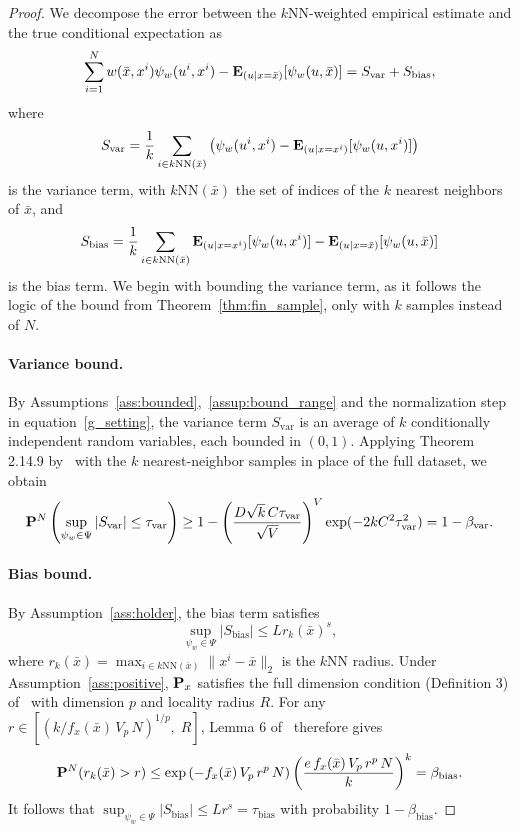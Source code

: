 \documentclass[11pt]{article}
\begin{document}
\begin{proof}
We decompose the error between the $k$NN-weighted empirical estimate and the true conditional expectation as
$$\sum_{i=1}^N w(\bar{x}, x^i) \psi_w(u^i, x^i) - \mathbf{E}_{(u | x = \bar{x})}[\psi_w(u, \bar{x})] = S_{\mathrm{var}} + S_{\mathrm{bias}},$$
where
$$S_{\mathrm{var}} = \frac{1}{k}\sum_{i \in k\text{NN}(\bar{x})} \left(\psi_w(u^{i}, x^{i}) - \mathbf{E}_{(u | x = x^{i})}[\psi_w(u, x^{i})]\right)$$
is the variance term, with $k\text{NN}(\bar{x})$ the set of indices of the $k$ nearest neighbors of $\bar{x}$, and
$$S_{\mathrm{bias}} = \frac{1}{k}\sum_{i \in k\text{NN}(\bar{x})} \mathbf{E}_{(u | x = x^{i})}[\psi_w(u, x^{i})] - \mathbf{E}_{(u | x = \bar{x})}[\psi_w(u, \bar{x})]$$
is the bias term. We begin with bounding the variance term, as it follows the logic of the bound from Theorem~\ref{thm:fin_sample}, only with $k$ samples instead of $N$.

\paragraph{Variance bound.}
By Assumptions~\ref{ass:bounded},~\ref{assup:bound_range} and the normalization step in equation~\eqref{g_setting}, the variance term $S_{\mathrm{var}}$ is an average of $k$ conditionally independent random variables, each bounded in $(0,1)$.
Applying Theorem 2.14.9 by~\cite{empirical} with the $k$ nearest-neighbor samples in place of the full dataset, we obtain
$${\mathbf P}^{N}\left (\sup_{\psi_{w} \in \Psi} |S_{\mathrm{var}}| \leq \tau_{\mathrm{var}}\right ) \geq 1 - \left (\frac{D\sqrt{k}\,C\tau_{\mathrm{var}}}{\sqrt{V}}\right )^V\exp(-2kC^2\tau_{\mathrm{var}}^2) = 1 - \beta_{\mathrm{var}}.$$

\paragraph{Bias bound.}
By Assumption~\ref{ass:holder}, the bias term satisfies
$$\sup_{\psi_w \in \Psi} |S_{\mathrm{bias}}| \leq L r_k(\bar{x})^s,$$
where $r_k(\bar{x}) = \max_{i \in k\text{NN}(\bar{x})} \|x^{i} - \bar{x}\|_2$ is the $k$NN radius.
Under Assumption~\ref{ass:positive}, ${\mathbf P}_x$ satisfies the full dimension condition (Definition 3) of~\cite{singh2016knn} with dimension $p$ and locality radius $R$.
For any $r \in \left[\left(k/f_x(\bar{x})\, V_p\, N\right)^{1/p},\; R\right]$, Lemma 6 of~\cite{singh2016knn} therefore gives
$${\mathbf P}^N(r_k(\bar{x}) > r) \leq \exp\left(-f_x(\bar{x})\, V_p\, r^p\, N\right)\left(\frac{e\,f_x(\bar{x})\, V_p\, r^p\, N}{k}\right)^k = \beta_{\mathrm{bias}}.$$
It follows that $\sup_{\psi_w \in \Psi} |S_{\mathrm{bias}}| \leq L r^{s} = \tau_{\mathrm{bias}} $ with probability $ 1 - \beta_{\mathrm{bias}}$.


\end{proof}
\end{document}
